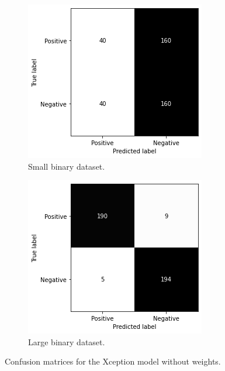 \begin{figure}
    \centering
    \begin{subfigure}[b]{0.49\textwidth}
        \centering
        \includegraphics[width=\textwidth]{figures/cm-n-weight-s-b.png}
        \caption{Small binary dataset.}
        \label{fig:cm-n-weight-s-b}
    \end{subfigure}
    \hfill
    \begin{subfigure}[b]{0.49\textwidth}
        \centering
        \includegraphics[width=\textwidth]{figures/cm-n-weight-l-b.png}
        \caption{Large binary dataset.}
        \label{fig:cm-n-weight-l-b}
    \end{subfigure}
    \caption{Confusion matrices for the Xception model without weights.}
    \label{fig:cm-no-weights}
\end{figure}

